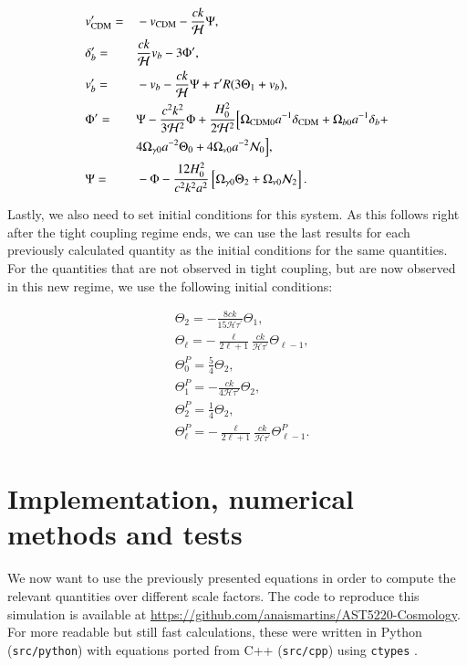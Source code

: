 \documentclass{aa}
\begin{document}
\begin{align*}
&v_{\rm CDM}^\prime =&& -v_{\rm CDM} -\frac{ck}{\mathcal{H}} \Psi, \\
&\delta_b^\prime =&& \frac{ck}{\mathcal{H}}v_b -3\Phi^\prime, \\
&v_b^\prime =&& -v_b - \frac{ck}{\mathcal{H}}\Psi + \tau^\prime R(3\Theta_1 + v_b), \\
&\Phi^\prime =&& \Psi - \frac{c^2k^2}{3\mathcal{H}^2} \Phi + \frac{H_0^2}{2\mathcal{H}^2}
\Bigl[\Omega_{\rm CDM 0} a^{-1} \delta_{\rm CDM} + \Omega_{b 0} a^{-1} \delta_b + \\& &&4\Omega_{\gamma 0}
a^{-2}\Theta_0 + 4\Omega_{\nu 0}a^{-2}\mathcal{N}_0\Bigr], \\
&\Psi =&& -\Phi - \frac{12H_0^2}{c^2k^2a^2}\left[\Omega_{\gamma 0}\Theta_2 + \Omega_{\nu 0}\mathcal{N}_2\right].
\end{align*}

Lastly, we also need to set initial conditions for this system. As this follows right after the tight coupling regime ends, we can use the last results for each previously calculated quantity as the initial conditions for the same quantities. For the quantities that are not observed in tight coupling, but are now observed in this new regime, we use the following initial conditions:

\begin{align*}
&\Theta_2 = -\frac{8ck}{15\mathcal{H}\tau^\prime} \Theta_1,\\
&\Theta_\ell = -\frac{\ell}{2\ell+1} \frac{ck}{\mathcal{H}\tau^\prime} \Theta_{\ell-1},\\
&\Theta_0^P = \frac{5}{4} \Theta_2, \\
&\Theta_1^P = -\frac{ck}{4\mathcal{H}\tau'} \Theta_2, \\
&\Theta_2^P = \frac{1}{4}\Theta_2, \\
&\Theta_\ell^P = -\frac{\ell}{2\ell+1} \frac{ck}{\mathcal{H}\tau^\prime} \Theta_{\ell-1}^P.
\end{align*}

\section{Implementation, numerical methods and tests}

We now want to use the previously presented equations in order to compute the relevant quantities over different scale factors. The code to reproduce this simulation is available at \url{https://github.com/anaismartins/AST5220-Cosmology}. For more readable but still fast calculations, these were written in Python (\texttt{src/python}) with equations ported from C++ (\texttt{src/cpp}) using \texttt{ctypes} \citep{ctypes}.
\end{document}
